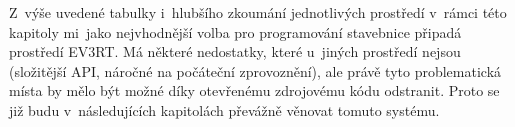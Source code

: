 Z~výše uvedené tabulky i~hlubšího zkoumání jednotlivých prostředí v~rámci této kapitoly mi~jako nejvhodnější volba pro programování stavebnice \legoEV{} připadá prostředí EV3RT.
Má některé nedostatky, které u~jiných prostředí nejsou (složitější API, náročné na počáteční zprovoznění), ale právě tyto problematická místa by mělo být možné díky otevřenému zdrojovému kódu odstranit.
Proto se již budu v~následujících kapitolách převážně věnovat tomuto systému.